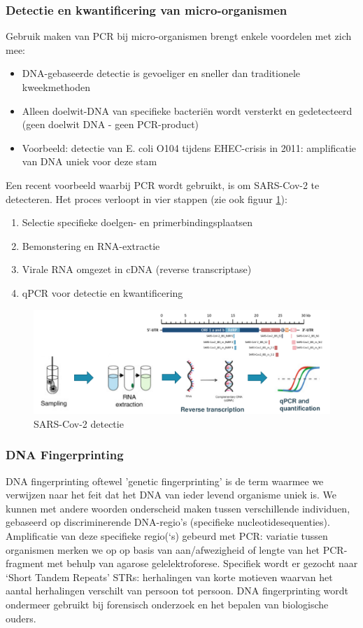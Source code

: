 \documentclass[a4paper,kul]{kulakarticle} %
\begin{document}
\subsubsection{Detectie en kwantificering van micro-organismen}
Gebruik maken van PCR bij micro-organismen brengt enkele voordelen met zich mee:
\begin{itemize}
	\item DNA-gebaseerde detectie is gevoeliger en sneller dan traditionele
	kweekmethoden
	\item Alleen doelwit-DNA van specifieke bacteriën wordt versterkt en
	gedetecteerd (geen doelwit DNA - geen PCR-product)
	\item Voorbeeld: detectie van E. coli O104 tijdens EHEC-crisis in 2011:
	amplificatie van DNA uniek voor deze stam
\end{itemize}
Een recent voorbeeld waarbij PCR wordt gebruikt, is om SARS-Cov-2 te detecteren. Het proces verloopt in vier stappen (zie ook figuur \ref{fig:coviddetectie}): 
\begin{enumerate}
	\item Selectie specifieke doelgen- en primerbindingsplaatsen
	\item Bemonstering en RNA-extractie
	\item Virale RNA omgezet in cDNA (reverse transcriptase)
	\item qPCR voor detectie en kwantificering
\end{enumerate}
\begin{figure}[h]
	\centering
	\includegraphics[width=0.7\linewidth]{COVIDDetectie}
	\caption[Covid detectie]{SARS-Cov-2 detectie}
	\label{fig:coviddetectie}
\end{figure}
\newpage
\subsubsection{DNA Fingerprinting}
DNA fingerprinting oftewel 'genetic fingerprinting' is de term waarmee we verwijzen naar het feit dat het DNA van ieder levend organisme uniek is. We kunnen met andere woorden onderscheid maken tussen verschillende individuen, gebaseerd op discriminerende DNA-regio's (specifieke nucleotidesequenties). Amplificatie van deze specifieke regio(‘s) gebeurd met PCR: variatie tussen organismen merken we op op basis van aan/afwezigheid of lengte van het PCR-fragment met behulp van agarose gelelektroforese. Specifiek wordt er gezocht naar `Short Tandem Repeats' STRs: herhalingen van korte motieven waarvan het aantal herhalingen verschilt van persoon tot persoon. DNA fingerprinting wordt ondermeer gebruikt bij forensisch onderzoek en het bepalen van biologische ouders. 
\end{document}

